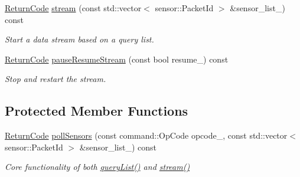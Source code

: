 \begin{DoxyCompactItemize}
\hyperlink{classroomba_1_1series500_1_1oi_1_1_o_i_encoder_ac2c8ad2f0306050926f89882d74696cc}{Return\+Code} \hyperlink{classroomba_1_1series500_1_1oi_1_1_o_i_encoder_ab771291acce95812bd1b41ff2b674baf}{stream} (const std\+::vector$<$ sensor\+::\+Packet\+Id $>$ \&sensor\+\_\+list\+\_\+) const 
\begin{DoxyCompactList}\small\item\em Start a data stream based on a query list. \end{DoxyCompactList}\item 
\hyperlink{classroomba_1_1series500_1_1oi_1_1_o_i_encoder_ac2c8ad2f0306050926f89882d74696cc}{Return\+Code} \hyperlink{classroomba_1_1series500_1_1oi_1_1_o_i_encoder_a7fa2db1885854427094d67cae5b29837}{pause\+Resume\+Stream} (const bool resume\+\_\+) const 
\begin{DoxyCompactList}\small\item\em Stop and restart the stream. \end{DoxyCompactList}\end{DoxyCompactItemize}
\subsection*{Protected Member Functions}
\begin{DoxyCompactItemize}
\item 
\hyperlink{classroomba_1_1series500_1_1oi_1_1_o_i_encoder_ac2c8ad2f0306050926f89882d74696cc}{Return\+Code} \hyperlink{classroomba_1_1series500_1_1oi_1_1_o_i_encoder_afd9efab31327a919e219580c2d09a9d9}{poll\+Sensors} (const command\+::\+Op\+Code opcode\+\_\+, const std\+::vector$<$ sensor\+::\+Packet\+Id $>$ \&sensor\+\_\+list\+\_\+) const 
\begin{DoxyCompactList}\small\item\em Core functionality of both \hyperlink{classroomba_1_1series500_1_1oi_1_1_o_i_encoder_a05c85b8943ee3c596c814c24fd5a9607}{query\+List()} and \hyperlink{classroomba_1_1series500_1_1oi_1_1_o_i_encoder_ab771291acce95812bd1b41ff2b674baf}{stream()} \end{DoxyCompactList}\end{DoxyCompactItemize}
